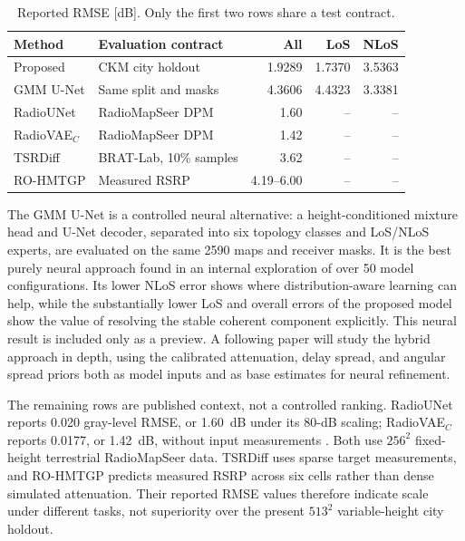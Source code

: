 \documentclass[10pt,conference,letterpaper]{IEEEtran}
\begin{document}
\begin{table}[t]
\centering
\caption{Reported RMSE [dB]. Only the first two rows share a test contract.}
\label{tab:accuracy-context}
\scriptsize
\setlength{\tabcolsep}{1.5pt}
\begin{tabular}{@{}>{\raggedright\arraybackslash}p{1.55cm}>{\raggedright\arraybackslash}p{1.95cm}rrr@{}}
\toprule
Method & Evaluation contract & All & LoS & NLoS \\
\midrule
Proposed & CKM city holdout & 1.9289 & 1.7370 & 3.5363 \\
GMM U-Net & Same split and masks & 4.3606 & 4.4323 & 3.3381 \\
RadioUNet \cite{radiounet2020} & RadioMapSeer DPM & 1.60 & -- & -- \\
RadioVAE$_C$ \cite{radiovae2025} & RadioMapSeer DPM & 1.42 & -- & -- \\
TSRDiff \cite{tsrdiff2025} & BRAT-Lab, 10\% samples & 3.62 & -- & -- \\
RO-HMTGP \cite{rohmtgp2025} & Measured RSRP & 4.19--6.00 & -- & -- \\
\bottomrule
\end{tabular}
\vspace{-4pt}
\end{table}

The GMM U-Net is a controlled neural alternative: a height-conditioned mixture
head and U-Net decoder, separated into six topology classes and LoS/NLoS
experts, are evaluated on the same 2590 maps and receiver masks. It is the best
purely neural approach found in an internal exploration of over 50 model
configurations. Its lower NLoS error shows where distribution-aware learning
can help, while the substantially lower LoS and overall errors of the proposed
model show the value of resolving the stable coherent component explicitly.
This neural result is included only as a preview. A following paper will study
the hybrid approach in depth, using the calibrated attenuation, delay spread,
and angular spread priors both as model inputs and as base estimates for neural
refinement.

The remaining rows are published context, not a controlled ranking. RadioUNet
reports 0.020 gray-level RMSE, or \SI{1.60}{dB} under its 80-dB scaling;
RadioVAE$_C$ reports 0.0177, or \SI{1.42}{dB}, without input measurements
\cite{radiounet2020,radiovae2025}. Both use $256^2$ fixed-height terrestrial
RadioMapSeer data. TSRDiff uses sparse target measurements, and RO-HMTGP
predicts measured RSRP across six cells rather than dense simulated
attenuation. Their reported
RMSE values therefore indicate scale under different tasks, not superiority
over the present $513^2$ variable-height city holdout.
\end{document}
